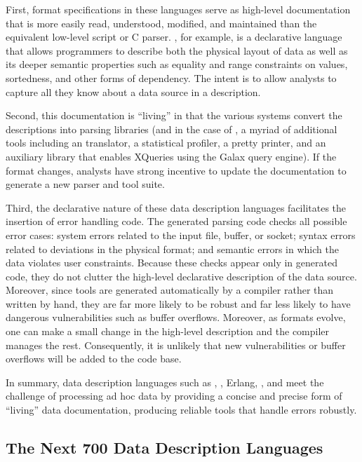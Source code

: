 First, format specifications in these languages serve as high-level
documentation that is more easily read, understood, modified, and
maintained than the equivalent low-level \perl{} script or C parser.  
\pads{}, for example, is a declarative language that 
allows programmers to describe both the physical layout of data
as well as its deeper semantic properties such as equality and range 
constraints on values, sortedness, and other forms of dependency.
The intent is to allow analysts to capture all they know about
a data source in a \pads{} description.  

Second, this documentation is ``living'' in that the various systems convert the descriptions into parsing libraries (and in the case of \pads{}, a myriad of additional tools including an \xml{} translator, a statistical profiler, a pretty printer, and an auxiliary library that enables XQueries using the Galax query engine\cite{galax}).  If the format changes, analysts have strong incentive to update the documentation to generate a new parser and tool suite.

Third, the declarative nature of these data description languages 
facilitates the insertion of error handling code. The generated parsing code checks all possible
error cases: system errors related to the input file, buffer, or
socket; syntax errors related to deviations in the physical format;
and semantic errors in which the data violates user
constraints. Because these checks appear only in generated code, they
do not clutter the high-level declarative description of the data
source. Moreover, since tools are generated automatically by a
compiler rather than written by hand, they are far more likely to be
robust and far less likely to have dangerous vulnerabilities such as
buffer overflows. Moreover, as formats evolve, one can
make a small change in the high-level description and the compiler
manages the rest. Consequently, it is unlikely that new
vulnerabilities or buffer overflows will be added to the code base.

In summary, data description languages such as \datascript{}, \packettypes{}, Erlang,  \blt{}, and \pads{} meet the challenge of processing
ad hoc data by providing a concise and precise form of ``living'' data documentation, producing reliable tools that handle errors robustly.


\subsection{The Next 700 Data Description Languages}

